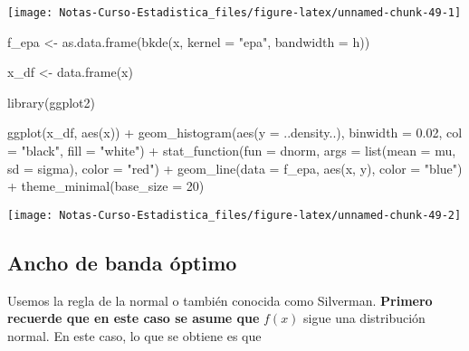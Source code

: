 \documentclass[
  12pt,
]{book}
\newenvironment{Shaded}{\begin{snugshade}}{\end{snugshade}}
\newcommand{\AttributeTok}[1]{\textcolor[rgb]{0.77,0.63,0.00}{#1}}
\newcommand{\DecValTok}[1]{\textcolor[rgb]{0.00,0.00,0.81}{#1}}
\newcommand{\FloatTok}[1]{\textcolor[rgb]{0.00,0.00,0.81}{#1}}
\newcommand{\FunctionTok}[1]{\textcolor[rgb]{0.00,0.00,0.00}{#1}}
\newcommand{\NormalTok}[1]{#1}
\newcommand{\OtherTok}[1]{\textcolor[rgb]{0.56,0.35,0.01}{#1}}
\newcommand{\SpecialCharTok}[1]{\textcolor[rgb]{0.00,0.00,0.00}{#1}}
\newcommand{\StringTok}[1]{\textcolor[rgb]{0.31,0.60,0.02}{#1}}
\theoremstyle{definition}
\theoremstyle{definition}
\theoremstyle{definition}
\theoremstyle{definition}
\theoremstyle{remark}
\begin{document}
\begin{center}\texttt{[image: Notas-Curso-Estadistica\_files/figure-latex/unnamed-chunk-49-1]} \end{center}

\begin{Shaded}
\begin{Highlighting}[]
\NormalTok{f\_epa }\OtherTok{\textless{}{-}} \FunctionTok{as.data.frame}\NormalTok{(}\FunctionTok{bkde}\NormalTok{(x, }\AttributeTok{kernel =} \StringTok{"epa"}\NormalTok{, }\AttributeTok{bandwidth =}\NormalTok{ h))}

\NormalTok{x\_df }\OtherTok{\textless{}{-}} \FunctionTok{data.frame}\NormalTok{(x)}

\FunctionTok{library}\NormalTok{(ggplot2)}

\FunctionTok{ggplot}\NormalTok{(x\_df, }\FunctionTok{aes}\NormalTok{(x)) }\SpecialCharTok{+} \FunctionTok{geom\_histogram}\NormalTok{(}\FunctionTok{aes}\NormalTok{(}\AttributeTok{y =}\NormalTok{ ..density..),}
    \AttributeTok{binwidth =} \FloatTok{0.02}\NormalTok{, }\AttributeTok{col =} \StringTok{"black"}\NormalTok{, }\AttributeTok{fill =} \StringTok{"white"}\NormalTok{) }\SpecialCharTok{+}
    \FunctionTok{stat\_function}\NormalTok{(}\AttributeTok{fun =}\NormalTok{ dnorm, }\AttributeTok{args =} \FunctionTok{list}\NormalTok{(}\AttributeTok{mean =}\NormalTok{ mu,}
        \AttributeTok{sd =}\NormalTok{ sigma), }\AttributeTok{color =} \StringTok{"red"}\NormalTok{) }\SpecialCharTok{+} \FunctionTok{geom\_line}\NormalTok{(}\AttributeTok{data =}\NormalTok{ f\_epa,}
    \FunctionTok{aes}\NormalTok{(x, y), }\AttributeTok{color =} \StringTok{"blue"}\NormalTok{) }\SpecialCharTok{+} \FunctionTok{theme\_minimal}\NormalTok{(}\AttributeTok{base\_size =} \DecValTok{20}\NormalTok{)}
\end{Highlighting}
\end{Shaded}

\begin{center}\texttt{[image: Notas-Curso-Estadistica\_files/figure-latex/unnamed-chunk-49-2]} \end{center}

\hypertarget{ancho-de-banda-uxf3ptimo-1}{%
\subsection{Ancho de banda óptimo}\label{ancho-de-banda-uxf3ptimo-1}}

Usemos la regla de la normal o también conocida como Silverman.
\textbf{Primero recuerde que en este caso se asume que} \(f(x)\) sigue una
distribución normal. En este caso, lo que se obtiene es que
\end{document}
